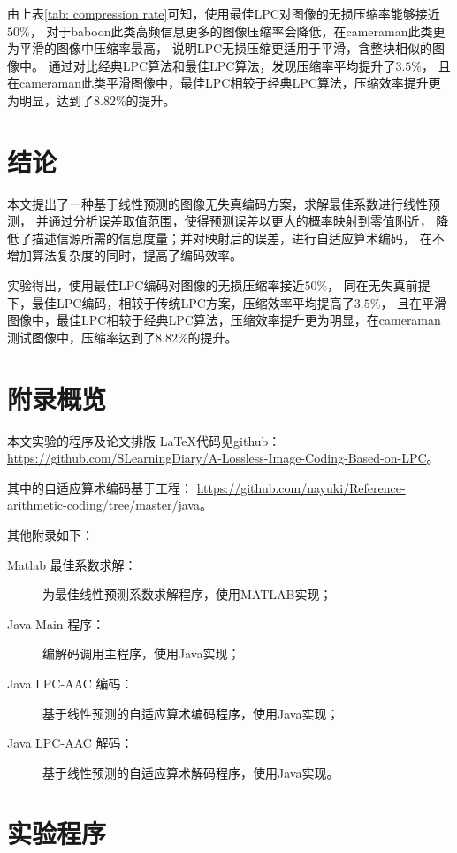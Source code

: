 \documentclass[12pt,a4paper]{article}%
\begin{document}
由上表\ref{tab: compression rate}可知，使用最佳LPC对图像的无损压缩率能够接近$50\%$，
对于baboon此类高频信息更多的图像压缩率会降低，在cameraman此类更为平滑的图像中压缩率最高，
说明LPC无损压缩更适用于平滑，含整块相似的图像中。
通过对比经典LPC算法和最佳LPC算法，发现压缩率平均提升了$3.5\%$，
且在cameraman此类平滑图像中，最佳LPC相较于经典LPC算法，压缩效率提升更为明显，达到了$8.82\%$的提升。


\section{结论}
本文提出了一种基于线性预测的图像无失真编码方案，求解最佳系数进行线性预测，
并通过分析误差取值范围，使得预测误差以更大的概率映射到零值附近，
降低了描述信源所需的信息度量；并对映射后的误差，进行自适应算术编码，
在不增加算法复杂度的同时，提高了编码效率。

实验得出，使用最佳LPC编码对图像的无损压缩率接近$50\%$，
同在无失真前提下，最佳LPC编码，相较于传统LPC方案，压缩效率平均提高了$3.5\%$，
且在平滑图像中，最佳LPC相较于经典LPC算法，压缩效率提升更为明显，在cameraman测试图像中，压缩率达到了$8.82\%$的提升。





\clearpage
\appendix
\section{附录概览}
本文实验的程序及论文排版 \LaTeX 代码见github：
\href{https://github.com/SLearningDiary/A-Lossless-Image-Coding-Based-on-LPC}
{https://github.com/SLearningDiary/A-Lossless-Image-Coding-Based-on-LPC}。

其中的自适应算术编码基于工程：
\href{https://github.com/nayuki/Reference-arithmetic-coding/tree/master/java}
{https://github.com/nayuki/Reference-arithmetic-coding/tree/master/java}。

其他附录如下：
\begin{description}
    \item[Matlab 最佳系数求解：] 为最佳线性预测系数求解程序，使用MATLAB实现；
    \item[Java Main 程序：] 编解码调用主程序，使用Java实现；
    \item[Java LPC-AAC 编码：] 基于线性预测的自适应算术编码程序，使用Java实现；
    \item[Java LPC-AAC 解码：] 基于线性预测的自适应算术解码程序，使用Java实现。
\end{description}

\section{实验程序}




\end{document}
